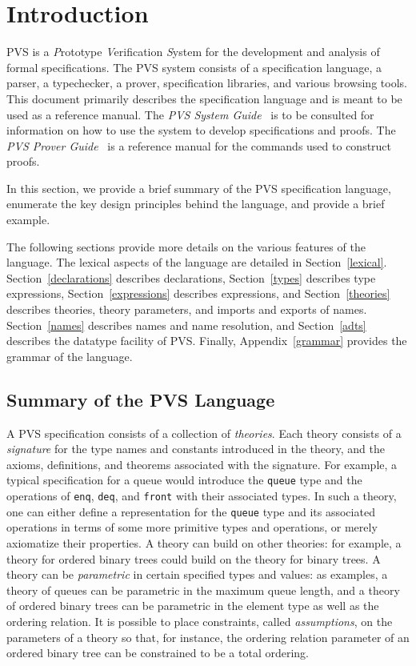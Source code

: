 
\chapter{Introduction}

PVS is a \emph{P}rototype \emph{V}erification \emph{S}ystem for the
development and analysis of formal specifications.  The PVS system
consists of a specification language, a parser, a typechecker, a prover,
specification libraries, and various browsing tools.  This document
primarily describes the specification language and is meant to be used as
a reference manual.  The \emph{PVS System Guide}~\cite{PVS:userguide} is to
be consulted for information on how to use the system to develop
specifications and proofs.  The \emph{PVS Prover Guide}~\cite{PVS:prover}
is a reference manual for the commands used to construct proofs.

In this section, we provide a brief summary of the PVS specification
language, enumerate the key design principles behind the language, and
provide a brief example.

The following sections provide more details on the various features of
the language.  The lexical aspects of the language are detailed in
Section~\ref{lexical}.  Section~\ref{declarations} describes
declarations, Section~\ref{types} describes type expressions,
Section~\ref{expressions} describes expressions, and
Section~\ref{theories} describes theories, theory parameters, and
imports and exports of names.  Section~\ref{names} describes names and
name resolution, and Section~\ref{adts} describes the datatype
facility of PVS.  Finally, 
Appendix~\ref{grammar} provides the grammar of the language.

\section{Summary of the PVS Language}

A PVS specification consists of a collection of \emph{theories}.
Each theory consists of a \emph{signature} for the type names and
constants introduced in the theory, and the axioms, definitions, and
theorems associated with the signature.  For example, a typical
specification for a queue would introduce the \texttt{queue} type and the
operations of \texttt{enq}, \texttt{deq}, and \texttt{front} with their
associated types.  In such a theory, one can either define a
representation for the \texttt{queue} type and its associated operations in
terms of some more primitive types and operations, or merely axiomatize
their properties.  A theory can build on other theories: for example, a
theory for ordered binary trees could build on the theory for
binary trees.  A theory can be \emph{parametric} in certain specified
types and values: as examples, a theory of queues can be parametric in
the maximum queue length, and a theory of ordered binary trees can be
parametric in the element type as well as the ordering relation.  It is
possible to place constraints, called \emph{assumptions}, on the
parameters of a theory so that, for instance, the ordering relation
parameter of an ordered binary tree can be constrained to be a total
ordering.

